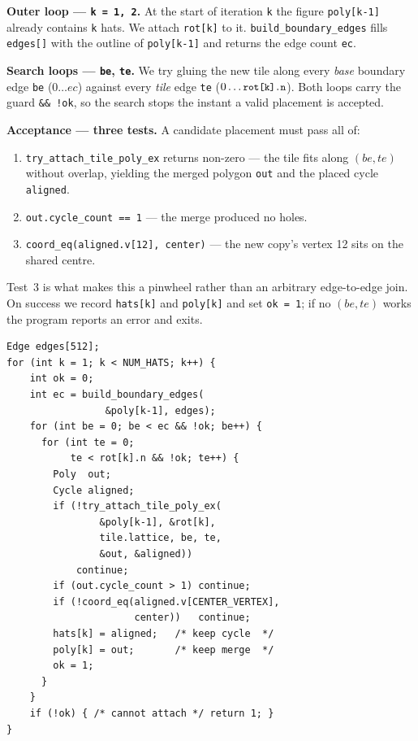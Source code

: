 \documentclass[10pt,a4paper]{article}
\newcommand{\code}[1]{\texttt{\small #1}}
\newcommand{\panegap}{\hfill}
\begin{document}
\par\medskip\noindent
\begin{minipage}[t]{0.46\linewidth}
\setlength{\parskip}{4pt}
\textbf{Outer loop — \code{k = 1, 2}.}  At the start of iteration \code{k}
the figure \code{poly[k-1]} already contains \code{k} hats.  We attach
\code{rot[k]} to it.  \code{build\_boundary\_edges} fills \code{edges[]}
with the outline of \code{poly[k-1]} and returns the edge count \code{ec}.

\textbf{Search loops — \code{be}, \code{te}.}  We try gluing the new tile
along every \emph{base} boundary edge \code{be} ($0\ldots ec$) against
every \emph{tile} edge \code{te} ($0\ldots\code{rot[k].n}$).  Both loops
carry the guard \code{\&\& !ok}, so the search stops the instant a valid
placement is accepted.

\textbf{Acceptance — three tests.}  A candidate placement must pass all of:
\begin{enumerate}
  \item \code{try\_attach\_tile\_poly\_ex} returns non-zero — the tile fits
    along $(be,te)$ without overlap, yielding the merged polygon \code{out}
    and the placed cycle \code{aligned}.
  \item \code{out.cycle\_count == 1} — the merge produced no holes.
  \item \code{coord\_eq(aligned.v[12], center)} — the new copy's vertex 12
    sits on the shared centre.
\end{enumerate}
Test~3 is what makes this a pinwheel rather than an arbitrary
edge-to-edge join.  On success we record \code{hats[k]} and \code{poly[k]}
and set \code{ok = 1}; if no $(be,te)$ works the program reports an error
and exits.
\end{minipage}\panegap
\begin{minipage}[t]{0.50\linewidth}
\begin{verbatim}
Edge edges[512];
for (int k = 1; k < NUM_HATS; k++) {
    int ok = 0;
    int ec = build_boundary_edges(
                 &poly[k-1], edges);
    for (int be = 0; be < ec && !ok; be++) {
      for (int te = 0;
           te < rot[k].n && !ok; te++) {
        Poly  out;
        Cycle aligned;
        if (!try_attach_tile_poly_ex(
                &poly[k-1], &rot[k],
                tile.lattice, be, te,
                &out, &aligned))
            continue;
        if (out.cycle_count > 1) continue;
        if (!coord_eq(aligned.v[CENTER_VERTEX],
                      center))   continue;
        hats[k] = aligned;   /* keep cycle  */
        poly[k] = out;       /* keep merge  */
        ok = 1;
      }
    }
    if (!ok) { /* cannot attach */ return 1; }
}
\end{verbatim}
\end{minipage}
\par\medskip
\end{document}
